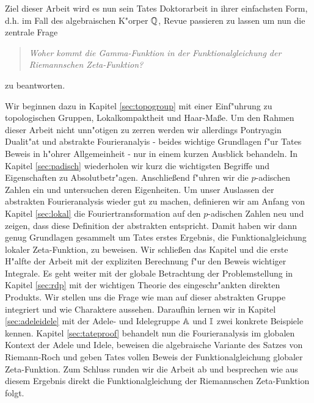 	Ziel dieser Arbeit wird es nun sein Tates Doktorarbeit in ihrer einfachsten Form, d.h. im Fall des algebraischen K"orper $\mathbb{Q}$, Revue passieren zu lassen um nun die zentrale Frage
	\begin{quote}
		\centering
		\textit{Woher kommt die Gamma-Funktion in der Funktionalgleichung der Riemannschen Zeta-Funktion?}
	\end{quote}
	zu beantworten. 
	
	Wir beginnen dazu in Kapitel \ref{sec:topogroup} mit einer Einf"uhrung zu topologischen Gruppen, Lokalkompaktheit und Haar-Maße.
	Um den Rahmen dieser Arbeit nicht unn"otigen zu zerren werden wir allerdings Pontryagin Dualit"at und abstrakte Fourieranalyis - beides wichtige Grundlagen f"ur Tates Beweis in h"ohrer Allgemeinheit - nur in einem kurzen Ausblick behandeln.
	In Kapitel \ref{sec:padisch} wiederholen wir kurz die wichtigsten Begriffe und Eigenschaften zu Absolutbetr"agen. 
	Anschließend f"uhren wir die $p$-adischen Zahlen ein und untersuchen deren Eigenheiten.
	Um unser Auslassen der abstrakten Fourieranalysis wieder gut zu machen, definieren wir am Anfang von Kapitel \ref{sec:lokal} die Fouriertransformation auf den $p$-adischen Zahlen neu und zeigen, dass diese Definition der abstrakten entspricht. 
	Damit haben wir dann genug Grundlagen gesammelt um Tates erstes Ergebnis, die Funktionalgleichung lokaler Zeta-Funktion, zu beweisen.
	Wir schließen das Kapitel und die erste H"alfte der Arbeit mit der expliziten Berechnung f"ur den Beweis wichtiger Integrale.
	Es geht weiter mit der globale Betrachtung der Problemstellung in Kapitel \ref{sec:rdp} mit der wichtigen Theorie des eingeschr"ankten direkten Produkts.
	Wir stellen uns die Frage wie man auf dieser abstrakten Gruppe integriert und wie Charaktere aussehen.
	Daraufhin lernen wir in Kapitel \ref{sec:adeleidele} mit der Adele- und Idelegruppe $\mathbb{A}$ und $\mathbb{I}$ zwei konkrete Beispiele kennen.
	Kapitel \ref{sec:tateproof} behandelt nun die Fourieranalysis im globalen Kontext der Adele und Idele, beweisen die algebraische Variante des Satzes von Riemann-Roch und geben Tates vollen Beweis der Funktionalgleichung globaler Zeta-Funktion. 
	Zum Schluss runden wir die Arbeit ab und besprechen wie aus diesem Ergebnis direkt die Funktionalgleichung der Riemannschen Zeta-Funktion folgt.
	
